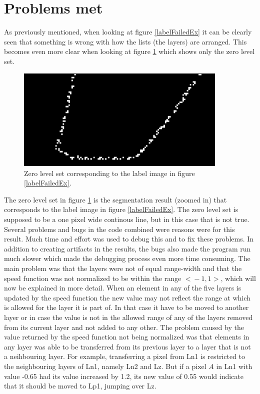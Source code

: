 \section{Problems met}
\label{ProblemsMet}
As previously mentioned, when looking at figure \ref{labelFailedEx} it can be clearly seen that something is wrong with how the lists (the layers) are arranged. This becomes even more clear when looking at figure \ref{failedZeroEx} which shows only the zero level set.
\begin{figure}[h!]
\centering
\includegraphics[width=0.90\textwidth]{implemented/failedZeroEx}
\caption{Zero level set corresponding to the label image in figure \ref{labelFailedEx}.}
\label{failedZeroEx}
\end{figure}
The zero level set in figure \ref{failedZeroEx} is the segmentation result (zoomed in) that corresponds to the label image in figure \ref{labelFailedEx}. The zero level set is supposed to be a one pixel wide continous line, but in this case that is not true. Several problems and bugs in the code combined were reasons were for this result. Much time and effort was used to debug this and to fix these problems. In addition to creating artifacts in the results, the bugs also made the program run much slower which made the debugging process even more time consuming. The main problem was that the layers were not of equal range-width and that the speed function was not normalized to be within the range $<\!-1,1\!>$, which will now be explained in more detail.
When an element in any of the five layers is updated by the speed function the new value may not reflect the range at which is allowed for the layer it is part of. In that case it have to be moved to another layer or in case the value is not in the allowed range of any of the layers removed from its current layer and not added to any other. The problem caused by the value returned by the speed function not being normalized was that elements in any layer was able to be transferred from its previous layer to a layer that is not a neihbouring layer. For example, transferring a pixel from Ln1 is restricted to the neighbouring layers of Ln1, namely Ln2 and Lz. But if a pixel $A$ in Ln1 with value -0.65 had its value increased by 1.2, its new value of 0.55 would indicate that it should be moved to Lp1, jumping over Lz. 
